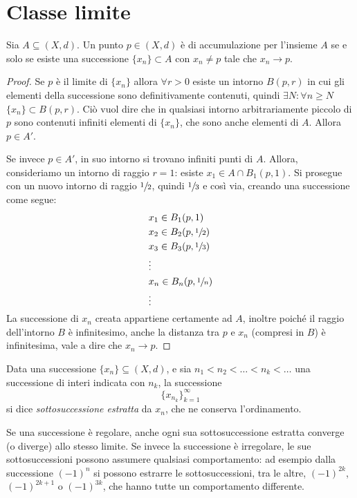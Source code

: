 \section{Classe limite}
\begin{lemma}
\label{l:pda_insieme}
Sia $A\subseteq (X,d)$. Un punto $p\in(X,d)$ è di accumulazione per l'insieme $A$ se e solo se esiste una successione $\{x_n\}\subset A$ con $x_n\neq p$ tale che $x_n\to p$.
\end{lemma}
\begin{proof}
Se $p$ è il limite di $\{x_n\}$ allora $\forall r>0$ esiste un intorno $B(p,r)$ in cui gli elementi della successione sono definitivamente contenuti, quindi $\exists N\colon\forall n\geq N$ $\{x_n\}\subset B(p,r)$. Ciò vuol dire che in qualsiasi intorno arbitrariamente piccolo di $p$ sono contenuti infiniti elementi di $\{x_n\}$, che sono anche elementi di $A$. Allora $p\in A'$.

Se invece $p\in A'$, in suo intorno si trovano infiniti punti di $A$. Allora, consideriamo un intorno di raggio $r=1$: esiste $x_1\in A\cap B_1(p,1)$. Si prosegue con un nuovo intorno di raggio $\sfrac{1}{2}$, quindi $\sfrac{1}{3}$ e così via, creando una successione come segue:
\begin{align*}
&x_1\in B_1(p,1)\\
&x_2\in B_2(p,\sfrac{1}{2})\\
&x_3\in B_3(p,\sfrac{1}{3})\\
&\vdots\\
&x_n\in B_n(p,\sfrac{1}{n})\\
&\vdots
\end{align*}
La successione di $x_n$ creata appartiene certamente ad $A$, inoltre poiché il raggio dell'intorno $B$ è infinitesimo, anche la distanza tra $p$ e $x_n$ (compresi in $B$) è infinitesima, vale a dire che $x_n\to p$.
\end{proof}
\begin{definizione}
\label{d:sottosuccessione}
Data una successione $\{x_n\}\subseteq(X,d)$, e sia $n_1<n_2<\dots<n_k<\dots$ una successione di interi indicata con $n_k$, la successione
\[
\big\{x_{n_k}\big\}_{k=1}^{\infty}
\]
si dice \emph{sottosuccessione estratta} da $x_n$, che ne conserva l'ordinamento.
\end{definizione}
Se una successione è regolare, anche ogni sua sottosuccessione estratta converge (o diverge) allo stesso limite. Se invece la successione è irregolare, le sue sottosuccessioni possono assumere qualsiasi comportamento: ad esempio dalla successione $(-1)^n$ si possono estrarre le sottosuccessioni, tra le altre, $(-1)^{2k}$, $(-1)^{2k+1}$ o $(-1)^{3k}$, che hanno tutte un comportamento differente.
